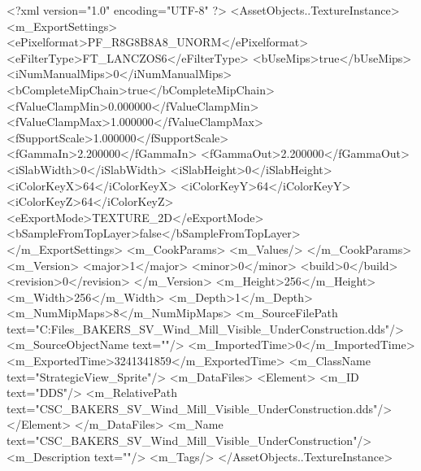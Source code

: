 <?xml version="1.0" encoding="UTF-8" ?>
<AssetObjects..TextureInstance>
	<m_ExportSettings>
		<ePixelformat>PF_R8G8B8A8_UNORM</ePixelformat>
		<eFilterType>FT_LANCZOS6</eFilterType>
		<bUseMips>true</bUseMips>
		<iNumManualMips>0</iNumManualMips>
		<bCompleteMipChain>true</bCompleteMipChain>
		<fValueClampMin>0.000000</fValueClampMin>
		<fValueClampMax>1.000000</fValueClampMax>
		<fSupportScale>1.000000</fSupportScale>
		<fGammaIn>2.200000</fGammaIn>
		<fGammaOut>2.200000</fGammaOut>
		<iSlabWidth>0</iSlabWidth>
		<iSlabHeight>0</iSlabHeight>
		<iColorKeyX>64</iColorKeyX>
		<iColorKeyY>64</iColorKeyY>
		<iColorKeyZ>64</iColorKeyZ>
		<eExportMode>TEXTURE_2D</eExportMode>
		<bSampleFromTopLayer>false</bSampleFromTopLayer>
	</m_ExportSettings>
	<m_CookParams>
		<m_Values/>
	</m_CookParams>
	<m_Version>
		<major>1</major>
		<minor>0</minor>
		<build>0</build>
		<revision>0</revision>
	</m_Version>
	<m_Height>256</m_Height>
	<m_Width>256</m_Width>
	<m_Depth>1</m_Depth>
	<m_NumMipMaps>8</m_NumMipMaps>
	<m_SourceFilePath text="C:\Users\Shadow\Desktop\Working Files\Icons\StrategicView\CSC_BAKERS_SV_Wind_Mill_Visible_UnderConstruction.dds"/>
	<m_SourceObjectName text=""/>
	<m_ImportedTime>0</m_ImportedTime>
	<m_ExportedTime>3241341859</m_ExportedTime>
	<m_ClassName text="StrategicView_Sprite"/>
	<m_DataFiles>
		<Element>
			<m_ID text="DDS"/>
			<m_RelativePath text="CSC_BAKERS_SV_Wind_Mill_Visible_UnderConstruction.dds"/>
		</Element>
	</m_DataFiles>
	<m_Name text="CSC_BAKERS_SV_Wind_Mill_Visible_UnderConstruction"/>
	<m_Description text=""/>
	<m_Tags/>
</AssetObjects..TextureInstance>

